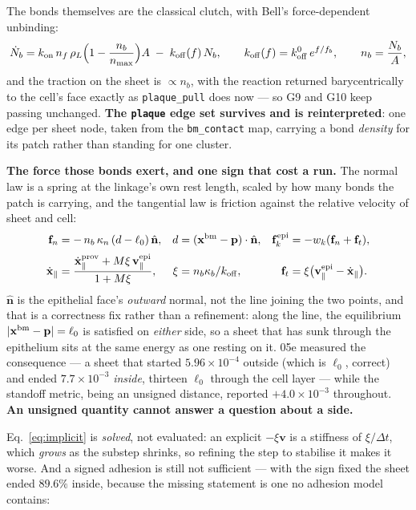 \documentclass[10pt,a4paper]{article}
\newcommand{\op}[1]{\texttt{#1}}
\begin{document}
The bonds themselves are the classical clutch, with Bell's force-dependent unbinding:
%
\begin{equation}
\dot N_b = k_{\rm on}\,n_f\,\rho_L\Bigl(1-\frac{n_b}{n_{\max}}\Bigr)A
 \;-\; k_{\rm off}(f)\,N_b,
\qquad k_{\rm off}(f)=k^0_{\rm off}\,e^{f/f_b},
\qquad n_b=\frac{N_b}{A},
\label{eq:clutch}
\end{equation}
%
and the traction on the sheet is $\propto n_b$, with the reaction returned barycentrically to the
cell's face exactly as \op{plaque\_pull} does now --- so G9 and G10 keep passing unchanged. \textbf{The
\op{plaque} edge set survives and is reinterpreted}: one edge per sheet node, taken from the
\op{bm\_contact} map, carrying a bond \emph{density} for its patch rather than standing for one
cluster.


\textbf{The force those bonds exert, and one sign that cost a run.} The normal law is a spring at the
linkage's own rest length, scaled by how many bonds the patch is carrying, and the tangential law is
friction against the relative velocity of sheet and cell:
%
\begin{align}
\mathbf f_n &= -\,n_b\,\kappa_n\,(d-\ell_0)\,\hat{\mathbf n},
&d &= (\mathbf x^{\rm bm}-\mathbf p)\cdot\hat{\mathbf n},
&\mathbf f^{\rm epi}_k &= -w_k(\mathbf f_n+\mathbf f_t),
\label{eq:plaque_n}\\[2pt]
\dot{\mathbf x}_\parallel &=
\frac{\dot{\mathbf x}^{\rm prov}_\parallel+M\xi\,\mathbf v^{\rm epi}_\parallel}{1+M\xi},
&\xi &= n_b\kappa_b/k_{\rm off},
&\mathbf f_t &= \xi\bigl(\mathbf v^{\rm epi}_\parallel-\dot{\mathbf x}_\parallel\bigr).
\label{eq:implicit}
\end{align}
%
$\hat{\mathbf n}$ is the epithelial face's \emph{outward} normal, not the line joining the two points,
and that is a correctness fix rather than a refinement: along the line, the equilibrium
$|\mathbf x^{\rm bm}-\mathbf p|=\ell_0$ is satisfied on \emph{either} side, so a sheet that has sunk
through the epithelium sits at the same energy as one resting on it. 05e measured the consequence --- a
sheet that started $5.96\times10^{-4}$ outside (which is $\ell_0$, correct) and ended
$7.7\times10^{-3}$ \emph{inside}, thirteen $\ell_0$ through the cell layer --- while the standoff
metric, being an unsigned distance, reported $+4.0\times10^{-3}$ throughout. \textbf{An unsigned
quantity cannot answer a question about a side.}

Eq.~\eqref{eq:implicit} is \emph{solved}, not evaluated: an explicit $-\xi\mathbf v$ is a stiffness of
$\xi/\Delta t$, which \emph{grows} as the substep shrinks, so refining the step to stabilise it makes
it worse. And a signed adhesion is still not sufficient --- with the sign fixed the sheet ended
$89.6\%$ inside, because the missing statement is one no adhesion model contains:
\end{document}

